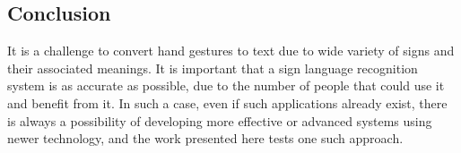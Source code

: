 \documentclass[12pt,oneside,a4paper]{article}
\begin{document}
		\subsection{Conclusion}
			It is a challenge to convert hand gestures to text due to wide variety of signs and their associated meanings. It is important that a sign language recognition system is as accurate as possible, due to the number of people that could use it and benefit from it. In such a case, even if such applications already exist, there is always a possibility of developing more effective or advanced systems using newer technology, and the work presented here tests one such approach.

	
	{}
\end{document}
